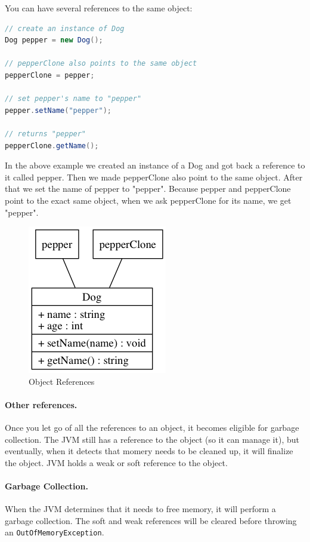 \documentclass[fleqn,10pt]{SelfArx} %
\begin{document}
You can have several references to the same object:
\begin{lstlisting}[language=Java]
// create an instance of Dog
Dog pepper = new Dog();

// pepperClone also points to the same object
pepperClone = pepper;

// set pepper's name to "pepper"
pepper.setName("pepper");

// returns "pepper"
pepperClone.getName();

\end{lstlisting}
In the above example we created an instance of a Dog and got back a reference to it called pepper. Then we made pepperClone also point to the same object. After that we set the name of pepper to "pepper". Because pepper and pepperClone point to the exact same object, when we ask pepperClone for its name, we get "pepper".

\begin{figure}[ht]\centering %
\includegraphics[width=0.5\linewidth]{object-reference}
\caption{Object References}
\label{fig:object-references}
\end{figure}
\paragraph{Other references.} Once you let go of all the references to an object, it becomes eligible for garbage collection. The JVM still has a reference to the object (so it can manage it), but eventually, when it detects that momery needs to be cleaned up, it will finalize the object. JVM holds a weak or soft reference to the object.\cite{reference}

\paragraph{Garbage Collection.} When the JVM determines that it needs to free memory, it will perform a garbage collection. The soft and weak references will be cleared before throwing an \texttt{OutOfMemoryException}. 
\end{document}

